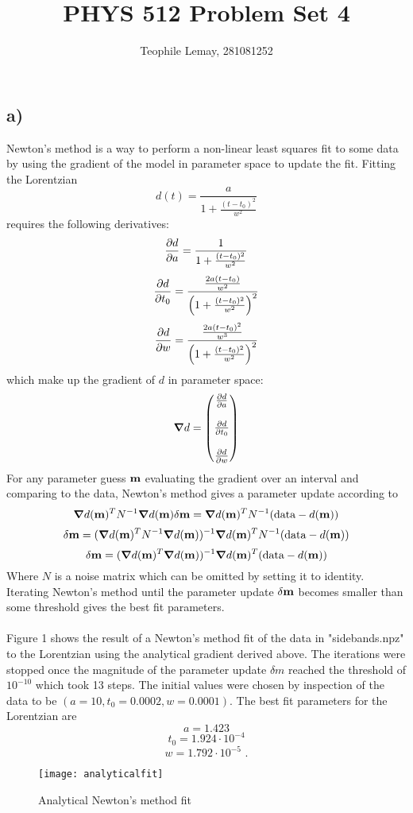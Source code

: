 \documentclass{article}
\title{PHYS 512 Problem Set 4}
\author{Teophile Lemay, 281081252}
\date{}
\newcommand{\<}[1]{\left\langle #1 \right\rangle }
\begin{document}
\maketitle
	
\section{}
\subsection{a)}
Newton's method is a way to perform a non-linear least squares fit to some data by using the gradient of the model in parameter space to update the fit. Fitting the Lorentzian 
\[d(t) = \frac{a}{1 + \frac{(t-t_0)^2}{w^2}}\] 
requires the following derivatives:
\[ \pdv{d}{a} = \frac{1}{1 + \frac{(t-t_0)^2}{w^2}} \]
\[ \pdv{d}{t_0} = \frac{ \frac{2a(t-t_0)}{w^2} }{ \left( 1 + \frac{(t-t_0)^2}{w^2} \right)^2 } \]
\[ \pdv{d}{w} = \frac{ \frac{2a(t-t_0)^2}{w^3} }{ \left( 1 + \frac{(t-t_0)^2}{w^2} \right)^2 } \]
which make up the gradient of $d$ in parameter space:
\[\grad{d} = 
\begin{pmatrix}
	\pdv{d}{a} \\\\
	
	\pdv{d}{t_0} \\\\
	
	\pdv{d}{w}
\end{pmatrix}\]
For any parameter guess $\vb{m}$ evaluating the gradient over an interval and comparing to the data, Newton's method gives a parameter update according to
\[ \grad{d(\vb{m})}^T N^{-1} \grad{d(\vb{m})} \delta \vb{m} = \grad{d(\vb{m})}^T N^{-1} (\text{data} - d(\vb{m}))\]
\[ \delta\vb{m} = (\grad{d(\vb{m})}^T N^{-1} \grad{d(\vb{m})})^{-1}\grad{d(\vb{m})}^T N^{-1} (\text{data} - d(\vb{m})) \]
\[ \delta\vb{m} = (\grad{d(\vb{m})}^T \grad{d(\vb{m})})^{-1}\grad{d(\vb{m})}^T (\text{data} - d(\vb{m})) \]
Where $N$ is a noise matrix which can be omitted by setting it to identity. Iterating Newton's method until the parameter update $\delta \vb{m}$ becomes smaller than some threshold gives the best fit parameters.\\
\\
Figure 1 shows the result of a Newton's method fit of the data in "sidebands.npz" to the Lorentzian using the analytical gradient derived above. The iterations were stopped once the magnitude of the parameter update $\delta m$ reached the threshold of $10^{-10}$ which took 13 steps. The initial values were chosen by inspection of the data to be $(a=10, t_0=0.0002, w=0.0001)$. The best fit parameters for the Lorentzian are
\[a = 1.423\]
\[t_0 = 1.924 \cdot 10^{-4}\]
\[w = 1.792 \cdot 10^{-5} \text{ .}\]
\begin{figure}[h]
	\caption{Analytical Newton's method fit}
	\centering
	\texttt{[image: analyticalfit]}
\end{figure}
\end{document}
